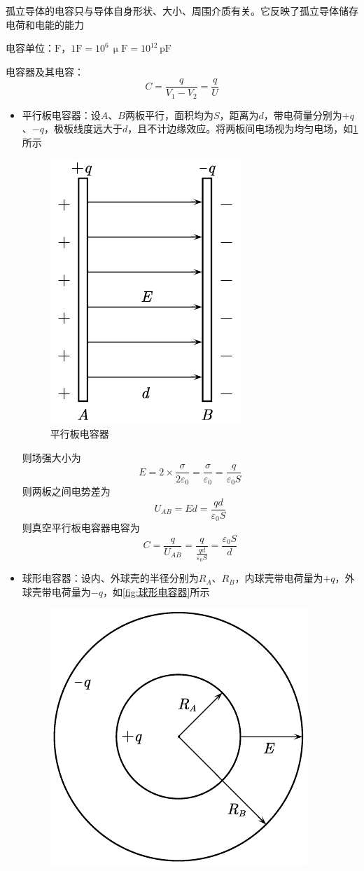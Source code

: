 \documentclass[12pt, a4paper, twoside]{ctexbook}
\begin{document}
孤立导体的电容只与导体自身形状、大小、周围介质有关。它反映了孤立导体储存电荷和电能的能力

{\sonti 电容单位}：$\mathrm{F}$，$1\mathrm{F}=10^6\,\upmu\mathrm{F}=10^{12}\,\mathrm{pF}$

{\sonti 电容器及其电容}：
$$
C=\frac{q}{V_1-V_2}=\frac{q}{U}
$$
\begin{itemize}
    \item {\sonti 平行板电容器}：设$A$、$B$两板平行，面积均为$S$，距离为$d$，带电荷量分别为$+q$、$-q$，极板线度远大于$d$，且不计边缘效应。将两板间电场视为均匀电场，如\textcolor{blue}{\cref{fig:平行板电容器}}所示
    \begin{figure}[H]
        \centerline{\includegraphics[scale=0.8]{平行板电容器.pdf}}
        \caption{平行板电容器}\label{fig:平行板电容器}
    \end{figure}
    则场强大小为
    $$
    E=2\times\frac{\sigma}{2\varepsilon_0}=\frac{\sigma}{\varepsilon_0}=\frac{q}{\varepsilon_0S}
    $$
    则两板之间电势差为
    $$
    U_{AB}=Ed=\frac{qd}{\varepsilon_0S}
    $$
    则真空平行板电容器电容为
    $$
    C=\frac{q}{U_{AB}}=\frac{q}{\frac{qd}{\varepsilon_0S}}=\frac{\varepsilon_0S}{d}
    $$
    \item {\sonti 球形电容器}：设内、外球壳的半径分别为$R_A$、$R_B$，内球壳带电荷量为$+q$，外球壳带电荷量为$-q$，如\textcolor{blue}{\cref{fig:球形电容器}}所示
    \begin{figure}[H]
        \centerline{\includegraphics[scale=0.8]{球形电容器.pdf}}

\end{figure}
\end{itemize}
\end{document}
